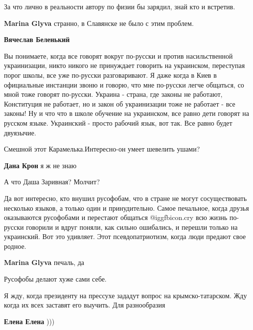 \begin{itemize}
\begin{itemize}
За что лично в реальности автору по физии бы зарядил, знай кто и встретив.


\textbf{Marina Glyva} странно, в Славянске не было с этим проблем.

\textbf{Вячеслав Беленький} 

Вы понимаете, когда все говорят вокруг по-русски и против насильственной
украинизации, никто никого не принуждает говорить на украинском, переступая
порог школы, все уже по-русски разговаривают. Я даже когда в Киев в официальные
инстанции звоню и говорю, что мне по-русски легче общаться, со мной тоже
говорят по-русски. Украина - страна, где законы не работают, Конституция не
работает, но и закон об украинизации тоже не работает - все законы! Ну и что
что в школе обучение на украинском, все равно дети говорят на русском языке.
Украинский - просто рабочий язык, вот так. Все равно будет двуязычие.

\end{itemize} %

Смешной этот Карамелька.Интересно-он умеет шевелить ушами?

\begin{itemize} %
\textbf{Дана Крон} я ж не знаю
\end{itemize} %

А что Даша Заривная? Молчит?


Да вот интересно, кто внушил русофобам, что в стране не могут сосуществовать
несколько языков, а только один и принудительно. Самое печальное, когда друзья
оказываются русофобами и перестают общаться @igg{fbicon.cry} всю жизнь по-русски говорили и
вдруг поняли, как сильно ошибались, и перешли только на украинский. Вот это
удивляет. Этот псевдопатриотизм, когда люди предают свое родное.

\begin{itemize} %
\textbf{Marina Glyva} печаль, да

Русофобы делают хуже сами себе.
\end{itemize} %


Я жду, когда президенту на прессухе зададут вопрос на крымско-татарском. Жду
когда их всех заставят его выучить. Для разнообразия

\begin{itemize} %
\textbf{Елена Елена} )))
\end{itemize} %


\end{itemize}
